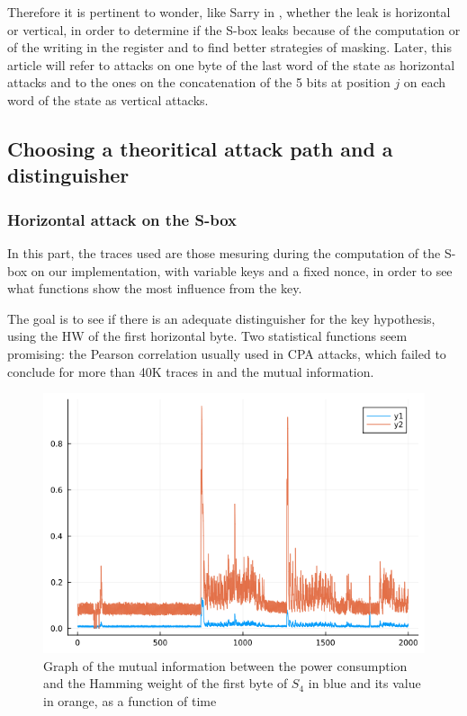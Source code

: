 \documentclass[a4paper,11pt,twocolumn]{article}
\begin{document}
		Therefore it is pertinent to wonder, like Sarry in \cite{these}, whether the leak is horizontal or vertical, in order to determine if the S-box leaks because of the computation or of the writing in the register and to find better strategies of masking. Later, this article will refer to attacks on one byte of the last word of the state as horizontal attacks and to the ones on the concatenation of the 5 bits at position $j$ on each word of the state as vertical attacks.
		
		\subsection{Choosing a theoritical attack path and a distinguisher} \label{choice}
		\subsubsection{Horizontal attack on the S-box}
		In this part, the traces used are those mesuring during the computation of the S-box on our implementation, with variable keys and a fixed nonce, in order to see what functions show the most influence from the key.
		
		The goal is to see if there is an adequate distinguisher for the key hypothesis, using the HW of the first horizontal byte. Two statistical functions seem promising: the Pearson correlation usually used in CPA attacks, which failed to conclude for more than 40K traces in \cite{dl_cpa} and the mutual information.
		
		\begin{figure}[h]
		\centering
		\includegraphics[scale=0.3]{horizontal_one_byte}
		\caption{Graph of the mutual information between the power consumption and the Hamming weight of the first byte of $S_4$ in blue and its value in orange, as a function of time}
		\label{hHW&val}
		\end{figure}
		
\end{document}
